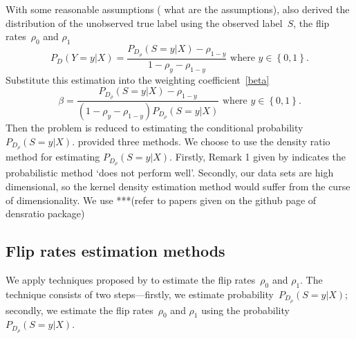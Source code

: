 \documentclass[12pt]{article} %
\begin{document}
With some reasonable assumptions ({\color{red} what are the assumptions}), \citet{liu2016classification} also derived the distribution of the unobserved  true label using the observed label~$S$, the flip rates~$\rho_{0}$ and $\rho_{1}$
\begin{equation}
    P_D(Y=y|X)=\frac{P_{D_\rho}(S=y|X)-\rho_{1-y}}{1-\rho_{y}-\rho_{1-y}}\text{ where }y\in \left\{0,1\right\}.
\end{equation}
Substitute this estimation into the weighting coefficient~\eqref{beta}
\begin{equation}
    \beta=\frac{P_{D_\rho}(S=y|X)-\rho_{1-y}}{(1-\rho_{y}-\rho_{1-y})P_{D_\rho}(S=y|X)}\text{ where }y\in \left\{0,1\right\}.
\end{equation}
Then the problem is reduced to estimating the conditional probability~$P_{D_\rho}(S=y|X)$.
\citet{liu2016classification} provided three methods. 
We choose to use the density ratio method for estimating $P_{D_\rho}(S=y|X)$. Firstly, Remark 1 given by \citet{liu2016classification} indicates the probabilistic method `does not perform well'. Secondly, our data sets are high dimensional, so the kernel density estimation method would suffer from the curse of dimensionality. We use ***(refer to papers given on the github page of densratio package)

\subsection{Flip rates estimation methods}\label{method2}
We apply techniques proposed by \citet{liu2016classification} to estimate the flip rates~$\rho_0$ and $\rho_1$. The technique consists of two steps---firstly, we estimate probability~$P_{D_\rho}(S=y|X)$; secondly, we estimate the flip rates~$\rho_0$ and $\rho_1$ using the probability~$P_{D_\rho}(S=y|X)$.
\end{document}
